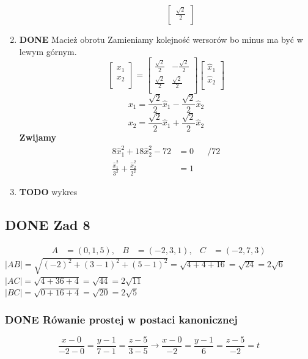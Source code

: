 \documentclass[11pt]{article}
\begin{document}
\begin{enumerate}
\begin{enumerate}
\begin{enumerate}
\[\begin{bmatrix}
                   \frac{\sqrt{2}}{2}\\
                 \end{bmatrix}\]
\end{enumerate}
\end{enumerate}
\item {\bfseries\sffamily DONE} Macież obrotu
\label{sec:org919858d}
Zamieniamy kolejność wersorów bo minus ma być w lewym górnym.
\[\begin{bmatrix}
x_{1}\\
x_{2}\\
\end{bmatrix} =\begin{bmatrix}
\frac{\sqrt{2}}{2} & -\frac{\sqrt{2}}{2}\\
\frac{\sqrt{2}}{2} & \frac{\sqrt{2}}{2}\\
\end{bmatrix}  \begin{bmatrix}
\hat{x}_{1}\\
\hat{x}_{2}\\
\end{bmatrix}\]
\[x_1 = \frac{\sqrt{2}}{2} \hat{x}_{1} - \frac{\sqrt{2}}{2} \hat{x}_2\]
\[x_2 = \frac{\sqrt{2}}{2} \hat{x}_{1} + \frac{\sqrt{2}}{2} \hat{x}_2\]
\textbf{Zwijamy}
\begin{align*}
  8 \hat{x}_1^2 + 18 \hat{x}_2^2 -72 &= 0 && / 72\\
  \frac{\hat{x}_{1}^{2}}{3^{2}} + \frac{\hat{x}_{2}^{2}}{2^{2}} &= 1
\end{align*}
\item {\bfseries\sffamily TODO} wykres
\label{sec:orgd308430}
\end{enumerate}
\subsection{{\bfseries\sffamily DONE} Zad 8}
\label{sec:orgf152727}
\begin{align*}
A&=(0,1,5),& B&=(-2,3,1),& C&=(-2, 7,3)
\end{align*}
\(|AB| = \sqrt{(-2)^{2} + (3-1)^{2} + (5 -1)^{2}} = \sqrt{4 + 4 +16} = \sqrt{24} = 2\sqrt{6}\)
\\\empty
\(|AC| = \sqrt{ 4 + 36 + 4} = \sqrt{44} = 2 \sqrt{11}\)
\\\empty
\(|BC| = \sqrt{0 + 16 + 4} = \sqrt{20} = 2\sqrt{5}\)
\subsubsection{{\bfseries\sffamily DONE} Rówanie prostej w postaci kanonicznej}
\label{sec:orgbf173be}
$$\frac{x - 0}{-2 - 0} = \frac{y - 1}{7 - 1} = \frac{z - 5}{3 -5}
\to \frac{x - 0}{-2} = \frac{y - 1}{6} = \frac{z - 5}{-2}
= t$$
\end{document}
